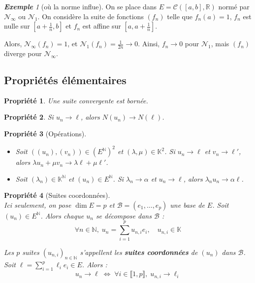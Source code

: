 \documentclass[12pt]{book}
\let\ensembleNombre\mathbb
\newcommand*\N{\ensuremath{\ensembleNombre{N}}}
\newcommand*\R{\ensuremath{\ensembleNombre{R}}}
\newcommand*\K{\ensuremath{\ensembleNombre{K}}}
\newcommand*\B{\ensuremath{\mathcal B}}
\newtheorem*{prop}{Propriété}
\theoremstyle{definition}
\theoremstyle{remark}
\newtheorem*{ex}{\textbf{Exemple}}
\begin{document}
	\begin{ex}[où la norme influe]
	On se place dans $E = \mathcal C([a,b], \R)$ normé par $\mathcal N_\infty$ ou $\mathcal N_1$. On considère la suite de fonctions $(f_n)$ telle que $f_n(a) = 1$, $f_n$ est nulle sur $\left[ a + \frac{1}{n}, b \right]$ et $f_n$ est affine sur $\left[a, a + \frac{1}{n} \right]$. 
	
	Alors, $\mathcal N_\infty (f_n) = 1$, et $\mathcal N_1(f_n) = \frac{1}{2n} \longrightarrow 0$.
	Ainsi, $f_n \longrightarrow 0$ pour $\mathcal N_1$, mais $(f_n)$ diverge pour $\mathcal N_\infty$.
	\end{ex}
	
	\subsection{Propriétés élémentaires}
	\begin{prop}
	Une suite convergente est bornée.
	\end{prop}
	
	\begin{prop}
	Si $u_n \longrightarrow \ell$, alors $N(u_n) \longrightarrow N(\ell)$. 
	\end{prop}
	
	\begin{prop}[Opérations]\mbox{~}\\
	\begin{itemize}
	\item Soit $((u_n), (v_n)) \in (E^\N)^2$ et $(\lambda, \mu) \in \K^2$. Si $u_n \longrightarrow \ell$ et $v_n \longrightarrow \ell'$, alors $\lambda u_n + \mu v_n \longrightarrow \lambda\ell + \mu\ell'$.
	\item Soit $(\lambda_n) \in \K^\N$ et $(u_n) \in E^\N$. Si $\lambda_n \longrightarrow \alpha$ et $u_n \longrightarrow \ell$, alors $\lambda_n u_n \longrightarrow \alpha \ell$.
	\end{itemize}
	\end{prop}
	
	\begin{prop}[Suites coordonnées]\mbox{~}\\
	Ici seulement, on pose $\dim E = p$ et $\B = (e_1, \ldots, e_p)$ une base de $E$. Soit $(u_n) \in E^\N$. Alors chaque $u_n$ se décompose dans $\B$ : 
	\[\forall n \in \N, \; \boxed{u_n = \sum_{i=1}^p u_{n,i}e_i,} \quad u_{n,i} \in \K \]
	
	Les $p$ suites $(u_{n,i})_{n\in \N}$ s'appellent les \textbf{suites coordonnées} de $(u_n)$ dans $\B$. Soit $\ell = \sum_{i=1}^p \ell_i e_i \in E$. Alors :
	\[ \boxed{u_n \longrightarrow \ell \;\Longleftrightarrow\; \forall i\in \llbracket 1, p \rrbracket, \; u_{n,i} \longrightarrow \ell_i} \]
	\end{prop}
	
\end{document}
